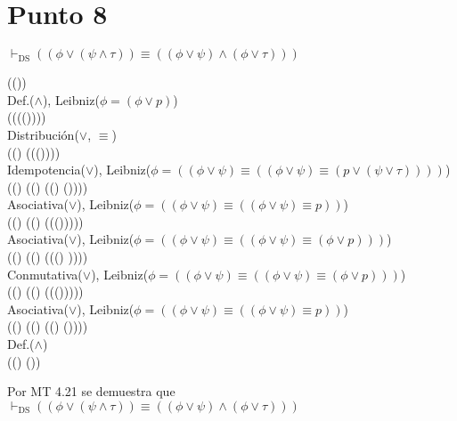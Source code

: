 \documentclass{article}
\begin{document}
\section{Punto 8}
\begin{logicenv}[2]{$\vdash_{\text{DS}} ((\phi \lor (\psi \land \tau)) \equiv ((\phi \lor \psi) \land (\phi \lor \tau)))$}
    \begin{derivation}
            (\phi \lor (\psi \land \tau))\\
        Def.($\land$), Leibniz($\phi = (\phi \lor p)$)\\
            (\phi \lor (\psi \equiv (\tau \equiv (\psi \lor \tau))))\\
        Distribución($\lor$, $\equiv$)\\
            ((\phi \lor \psi) \equiv (\phi \lor (\tau \equiv (\psi \lor \tau))))\\
        Idempotencia($\lor$), Leibniz($\phi = ((\phi \lor \psi) \equiv ((\phi \lor \psi) \equiv (p \lor (\psi \lor \tau))))$)\\
            ((\phi \lor \psi) \equiv ((\phi \lor \tau) \equiv ((\phi \lor \phi) \lor (\psi \lor \tau))))\\
        Asociativa($\lor$), Leibniz($\phi = ((\phi \lor \psi) \equiv ((\phi \lor \psi) \equiv p))$)\\
            ((\phi \lor \psi) \equiv ((\phi \lor \psi) \equiv (\phi \lor (\phi \lor (\psi \lor \tau)))))\\
        Asociativa($\lor$), Leibniz($\phi = ((\phi \lor \psi) \equiv ((\phi \lor \psi) \equiv (\phi \lor p)))$)\\
            ((\phi \lor \psi) \equiv ((\phi \lor \psi) \equiv (\phi \lor ((\phi \lor \psi) \lor \tau))))\\
        Conmutativa($\lor$), Leibniz($\phi = ((\phi \lor \psi) \equiv ((\phi \lor \psi) \equiv (\phi \lor p)))$)\\
            ((\phi \lor \psi) \equiv ((\phi \lor \psi) \equiv (\phi \lor (\tau \lor (\phi \lor \psi)))))\\
        Asociativa($\lor$), Leibniz($\phi = ((\phi \lor \psi) \equiv ((\phi \lor \psi) \equiv p))$)\\
            ((\phi \lor \psi) \equiv ((\phi \lor \psi) \equiv ((\phi \lor \tau) \lor (\phi \lor \psi))))\\
        Def.($\land$)\\
            ((\phi \lor \psi) \land (\phi \lor \psi))
    \end{derivation}
    Por MT 4.21 se demuestra que\\
    $\vdash_{\text{DS}} ((\phi \lor (\psi \land \tau)) \equiv ((\phi \lor \psi) \land (\phi \lor \tau)))$
\end{logicenv}
\end{document}
